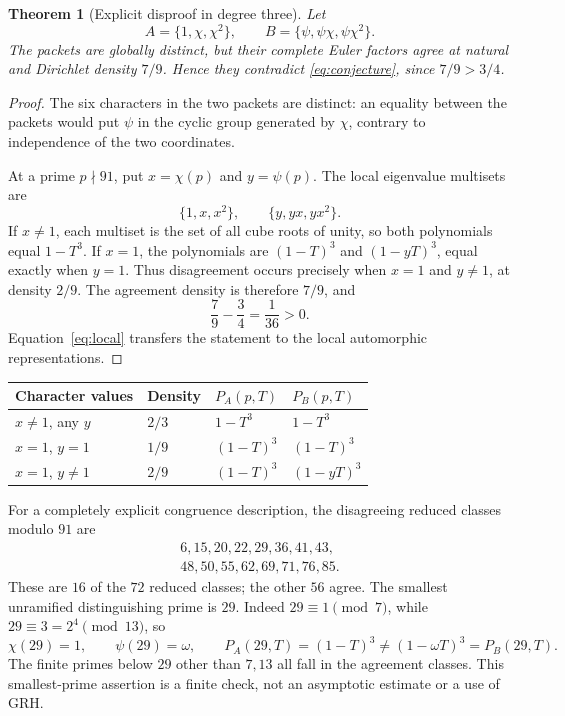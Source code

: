 \documentclass[11pt]{article}
\newtheorem{theorem}{Theorem}[section]
\theoremstyle{remark}\newtheorem{remark}[theorem]{Remark}
\begin{document}
\begin{theorem}[Explicit disproof in degree three]\label{thm:counter}
Let
\begin{equation}\label{eq:packets}
 A=\{1,\chi,\chi^2\},\qquad
 B=\{\psi,\psi\chi,\psi\chi^2\}.
\end{equation}
The packets are globally distinct, but their complete Euler factors agree at natural and Dirichlet density $7/9$. Hence they contradict \eqref{eq:conjecture}, since $7/9>3/4$.
\end{theorem}

\begin{proof}
The six characters in the two packets are distinct: an equality between the packets would put $\psi$ in the cyclic group generated by $\chi$, contrary to independence of the two coordinates.

At a prime $p\nmid91$, put $x=\chi(p)$ and $y=\psi(p)$. The local eigenvalue multisets are
\[
 \{1,x,x^2\},\qquad \{y,yx,yx^2\}.
\]
If $x\ne1$, each multiset is the set of all cube roots of unity, so both polynomials equal $1-T^3$. If $x=1$, the polynomials are $(1-T)^3$ and $(1-yT)^3$, equal exactly when $y=1$. Thus disagreement occurs precisely when $x=1$ and $y\ne1$, at density $2/9$. The agreement density is therefore $7/9$, and
\[
 \frac79-\frac34=\frac1{36}>0.
\]
Equation~\eqref{eq:local} transfers the statement to the local automorphic representations.
\end{proof}

\begin{center}
\begin{tabular}{@{}llll@{}}\toprule
Character values & Density & $P_A(p,T)$ & $P_B(p,T)$\\\midrule
$x\ne1$, any $y$ & $2/3$ & $1-T^3$ & $1-T^3$\\
$x=1$, $y=1$ & $1/9$ & $(1-T)^3$ & $(1-T)^3$\\
$x=1$, $y\ne1$ & $2/9$ & $(1-T)^3$ & $(1-yT)^3$\\\bottomrule
\end{tabular}
\end{center}

For a completely explicit congruence description, the disagreeing reduced classes modulo $91$ are
\begin{equation}\label{eq:classes}
 \begin{gathered}
 6,15,20,22,29,36,41,43,\\
 48,50,55,62,69,71,76,85.
 \end{gathered}
\end{equation}
These are $16$ of the $72$ reduced classes; the other $56$ agree. The smallest unramified distinguishing prime is $29$. Indeed $29\equiv1\pmod7$, while $29\equiv3=2^4\pmod{13}$, so
\[
 \chi(29)=1,\qquad\psi(29)=\omega,
 \qquad P_A(29,T)=(1-T)^3\ne(1-\omega T)^3=P_B(29,T).
\]
The finite primes below $29$ other than $7,13$ all fall in the agreement classes. This smallest-prime assertion is a finite check, not an asymptotic estimate or a use of GRH.
\end{document}
